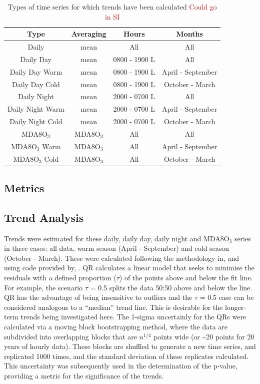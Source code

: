 \documentclass[journal abbreviation, manuscript]{copernicus}
\begin{document}
\begin{table}[h]
\caption{Types of time series for which trends have been calculated \textcolor{red}{Could go in SI}}
\begin{tabular}{c|c c c}
Type              & Averaging & Hours         & Months            \\ \hline
Daily             & mean      & All           & All               \\
Daily Day         & mean      & 0800 - 1900 L & All               \\
Daily Day Warm    & mean      & 0800 - 1900 L & April - September \\
Daily Day Cold    & mean      & 0800 - 1900 L & October - March   \\
Daily Night       & mean      & 2000 - 0700 L & All               \\
Daily Night Warm  & mean      & 2000 - 0700 L & April - September \\
Daily Night Cold  & mean      & 2000 - 0700 L & October - March   \\
MDA8O$_3$              & MDA8O$_3$      & All           & All               \\
MDA8O$_3$ Warm         & MDA8O$_3$      & All           & April - September \\
MDA8O$_3$ Cold         & MDA8O$_3$      & All           & October - March   \\
\end{tabular}
\label{tab:ts_types}
\end{table}

\subsection{Metrics}

\subsection{Trend Analysis}
Trends were estimated for these daily, daily day, daily night and MDA8O$_3$ series in three cases: all data, warm season (April - September) and cold season (October - March). These were calculated following the methodology in, and using code provided by, \cite{chang2023guidancenotebeststatistical}. QR calculates a linear model that seeks to minimise the residuals with a defined proportion ($\tau$) of the points above and below the fit line. For example, the scenario $\tau$ = 0.5 splits the data 50:50 above and below the line. QR has the advantage of being insensitive to outliers and the $\tau$ = 0.5 case can be considered analogous to a “median” trend line. This is desirable for the longer-term trends being investigated here. The 1-sigma uncertainly for the QRs were calculated via a moving block bootstrapping method, where the data are subdivided into overlapping blocks that are $n^{1/4}$ points wide (or \textasciitilde{20} points for 20 years of hourly data). These blocks are shuffled to generate a new time series, and replicated 1000 times, and the standard deviation of these replicates calculated. This uncertainty was subsequently used in the determination of the p-value, providing a metric for the significance of the trends. 
\end{document}
